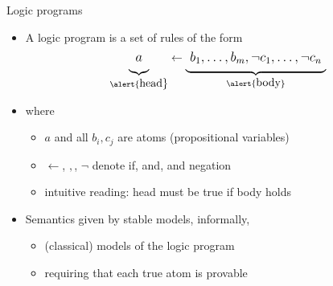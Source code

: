 \begin{frame}{Logic programs}
  \medskip
  \begin{itemize}
  \item<2->
    A \alert{logic program} is a \alert{set of rules} of the form
    \begin{align*}\large
      \underbrace{a\raisebox{-6pt}{}}_{\text{\alert{\normalsize head}}}
      \leftarrow
      \underbrace{\raisebox{-6pt}{\ }b_1,\dots,b_m,\neg c_1,\dots,\neg c_n\raisebox{-6pt}{\ }}_{\alert{\text{\normalsize body}}}
    \end{align*}
  \item<2-> [] where
    \begin{itemize}\normalsize
    \item $a$ and all $b_i,c_j$ are \alert{atoms} (propositional variables)
    \item \alert{$\leftarrow$}, \alert{$,$}, \alert{$\neg$} denote \alert{if}, \alert{and}, and \alert{negation}
    \item intuitive reading: \alert{head} must be true \alert{if body} holds
    \end{itemize}
    \bigskip
  \item<3->
    Semantics given by \alert{stable models}, informally,
    \begin{itemize}\normalsize
    \item (classical) models of the logic program
    \item requiring that each true atom is provable
    \end{itemize}
  \end{itemize}
\end{frame}
%
